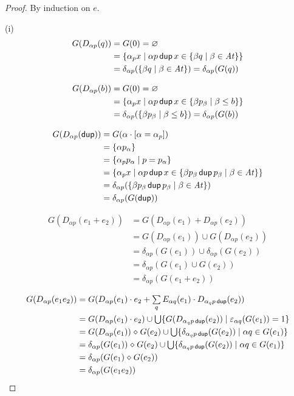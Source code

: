 \documentclass{article}
\newcommand\cset[1]{\{#1\}}
\newcommand\At{\ensuremath{\mathit{At}}}
\renewcommand\smash{\mathrel{\diamond}}
\newcommand\ssum{\mathop{\textstyle\sum}}
\newcommand\pdup{\mathop{\mathsf{dup}}}
\newcommand\bval[1]{[#1]}
\newcommand\sbigcup{\mathop{\textstyle\bigcup}}
\begin{document}
\begin{proof}
By induction on $e$.

(i)
\begin{align*}
G(D_{\alpha p}(q))
&= G(0)
= \emptyset\\
&= \set{\alpha_p x}{\alpha p\pdup x\in\set{\beta q}{\beta\in\At}}\\
&= \delta_{\alpha p}(\set{\beta q}{\beta\in\At})
= \delta_{\alpha p}(G(q))
\end{align*}

\begin{align*}
G(D_{\alpha p}(b))
&= G(0)
= \emptyset\\
&= \set{\alpha_p x}{\alpha p\pdup x\in\set{\beta p_\beta}{\beta\leq b}}\\
&= \delta_{\alpha p}(\set{\beta p_\beta}{\beta\leq b})
= \delta_{\alpha p}(G(b))
\end{align*}

\begin{align*}
G(D_{\alpha p}(\pdup))
&= G(\alpha\cdot\bval{\alpha=\alpha_p})\\
&= \cset{\alpha p_\alpha}\\
&= \set{\alpha_p p_\alpha}{p=p_\alpha}\\
&= \set{\alpha_p x}{\alpha p\pdup x\in\set{\beta p_\beta\pdup p_\beta}{\beta\in\At}}\\
&= \delta_{\alpha p}(\set{\beta p_\beta\pdup p_\beta}{\beta\in\At})\\
&= \delta_{\alpha p}(G(\pdup))
\end{align*}

\begin{align*}
G(D_{\alpha p}(e_1+e_2))
&= G(D_{\alpha p}(e_1)+D_{\alpha p}(e_2))\\
&= G(D_{\alpha p}(e_1))\cup G(D_{\alpha p}(e_2))\\
&= \delta_{\alpha p}(G(e_1))\cup\delta_{\alpha p}(G(e_2))\\
&= \delta_{\alpha p}(G(e_1)\cup G(e_2))\\
&= \delta_{\alpha p}(G(e_1+e_2))
\end{align*}

\begin{align*}
G(D_{\alpha p}(e_1e_2))
&= G(D_{\alpha p}(e_1)\cdot e_2 + \ssum_{q} E_{\alpha q}(e_1)\cdot D_{\alpha_q p\pdup}(e_2))\\
&= G(D_{\alpha p}(e_1)\cdot e_2) \cup \sbigcup \set{G(D_{\alpha_q p\pdup}(e_2))}{\eps_{\alpha q}(G(e_1))=1}\\
&= G(D_{\alpha p}(e_1))\smash G(e_2) \cup \sbigcup \set{\delta_{\alpha_q p\pdup}(G(e_2))}{\alpha q\in G(e_1)}\\
&= \delta_{\alpha p}(G(e_1))\smash G(e_2) \cup \sbigcup \set{\delta_{\alpha_q p\pdup}(G(e_2))}{\alpha q\in G(e_1)}\\
&= \delta_{\alpha p}(G(e_1)\smash G(e_2))\\
&= \delta_{\alpha p}(G(e_1e_2))
\end{align*}


\end{proof}
\end{document}
